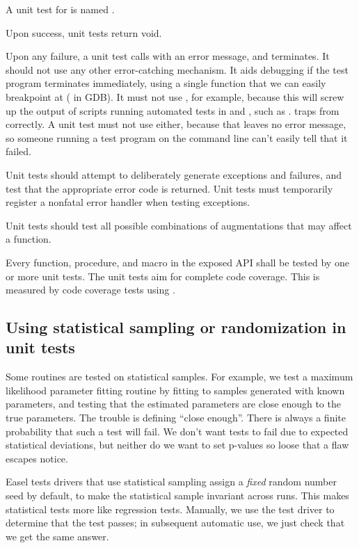 A unit test for  is named . 

Upon success, unit tests return void.

Upon any failure, a unit test calls  with an error
message, and terminates. It should not use any other error-catching
mechanism. It aids debugging if the test program terminates
immediately, using a single function that we can easily breakpoint at
( in GDB). It must not use ,
for example, because this will screw up the output of scripts running
automated tests in  and , such as
.  traps  from
 correctly. A unit test must not use
 either, because that leaves no error message, so
someone running a test program on the command line can't easily tell
that it failed.

Unit tests should attempt to deliberately generate exceptions and
failures, and test that the appropriate error code is returned.  Unit
tests must temporarily register a nonfatal error handler when testing
exceptions. 

Unit tests should test all possible combinations of augmentations that
may affect a function.

Every function, procedure, and macro in the exposed API shall be
tested by one or more unit tests. The unit tests aim for complete code
coverage. This is measured by code coverage tests using .


\subsection{Using statistical sampling or randomization in unit tests}

Some routines are tested on statistical samples. For example, we test
a maximum likelihood parameter fitting routine by fitting to samples
generated with known parameters, and testing that the estimated
parameters are close enough to the true parameters.  The trouble is
defining ``close enough''. There is always a finite probability that
such a test will fail. We don't want tests to fail due to expected
statistical deviations, but neither do we want to set p-values so
loose that a flaw escapes notice.

Easel tests drivers that use statistical sampling assign a
\emph{fixed} random number seed by default, to make the statistical
sample invariant across runs. This makes statistical tests more like
regression tests. Manually, we use the test driver to determine that
the test passes; in subsequent automatic use, we just check that we
get the same answer.

